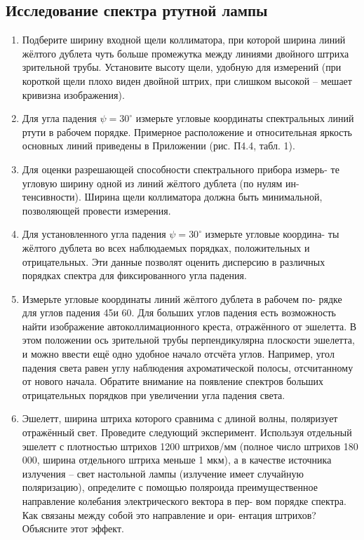 \documentclass[a4paper]{article}
\begin{document}
\subsection{Исследование спектра ртутной лампы}
\begin{enumerate}
  \item Подберите ширину входной щели коллиматора, при которой ширина
  линий жёлтого дублета чуть больше промежутка между линиями двойного
  штриха зрительной трубы. Установите высоту щели, удобную для
  измерений (при короткой щели плохо виден двойной штрих, при слишком
  высокой -- мешает кривизна изображения).
  \item Для угла падения $\psi = 30^{\circ}$ измерьте угловые координаты спектральных
  линий ртути в рабочем порядке. Примерное расположение и относительная
  яркость основных линий приведены в Приложении (рис. П4.4,
  табл. 1).
  \item Для оценки разрешающей способности спектрального прибора измерь-
  те угловую ширину одной из линий жёлтого дублета (по нулям ин-
  тенсивности). Ширина щели коллиматора должна быть минимальной,
  позволяющей провести измерения.
  \item Для установленного угла падения $\psi = 30^{\circ}$ измерьте угловые координа-
  ты жёлтого дублета во всех наблюдаемых порядках, положительных и
  отрицательных. Эти данные позволят оценить дисперсию в различных
  порядках спектра для фиксированного угла падения.
  \item Измерьте угловые координаты линий жёлтого дублета в рабочем по-
  рядке для углов падения 45\textdegree и 60\textdegree. Для больших углов падения есть
  возможность найти изображение автоколлимационного креста, отражённого
  от эшелетта. В этом положении ось зрительной трубы перпендикулярна
  плоскости эшелетта, и можно ввести ещё одно удобное
  начало отсчёта углов. Например, угол падения света равен углу наблюдения
  ахроматической полосы, отсчитанному от нового начала.
  Обратите внимание на появление спектров больших отрицательных
  порядков при увеличении угла падения света.
  \item Эшелетт, ширина штриха которого сравнима с длиной волны, поляризует
  отражённый свет. Проведите следующий эксперимент. Используя
  отдельный эшелетт с плотностью штрихов 1200 штрихов/мм (полное
  число штрихов 180 000, ширина отдельного штриха меньше 1 мкм), а
  в качестве источника излучения -- свет настольной лампы (излучение
  имеет случайную поляризацию), определите с помощью поляроида преимущественное
  направление колебания электрического вектора в пер-
  вом порядке спектра. Как связаны между собой это направление и ори-
  ентация штрихов? Объясните этот эффект.
\end{enumerate}
\end{document}
